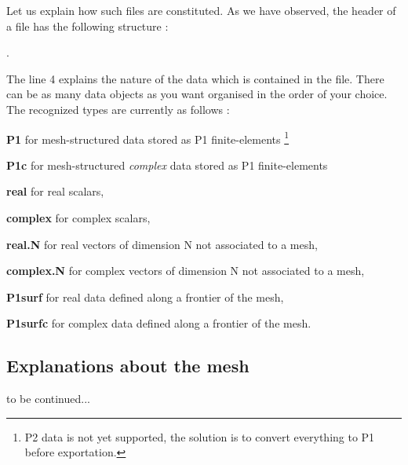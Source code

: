 Let us explain how such files are constituted. As we have observed, the header of a  file has the following structure :

.

The line 4 explains the nature of the data which is contained in the file.
There can be as many data objects as you want organised in the order of your choice. The recognized types are currently as follows :
\begin{description}
\item{ \bf P1}  for mesh-structured data stored as P1 finite-elements
\footnote{P2 data is not yet supported, the solution is to convert everything to P1 before exportation.}  
\item{\bf P1c}  for mesh-structured {\em complex} data stored as P1 finite-elements
\item{\bf real} for real scalars,
\item{\bf complex} for complex scalars,
\item{\bf real.N} for real vectors of dimension N not associated to a mesh,
\item{\bf complex.N} for complex vectors of dimension N not associated to a mesh,
\item{\bf P1surf} for real data defined along a frontier of the mesh,
\item{\bf P1surfc} for complex data defined along a frontier of the mesh.
\end{description}

\subsection{Explanations about the mesh }

to be continued...







